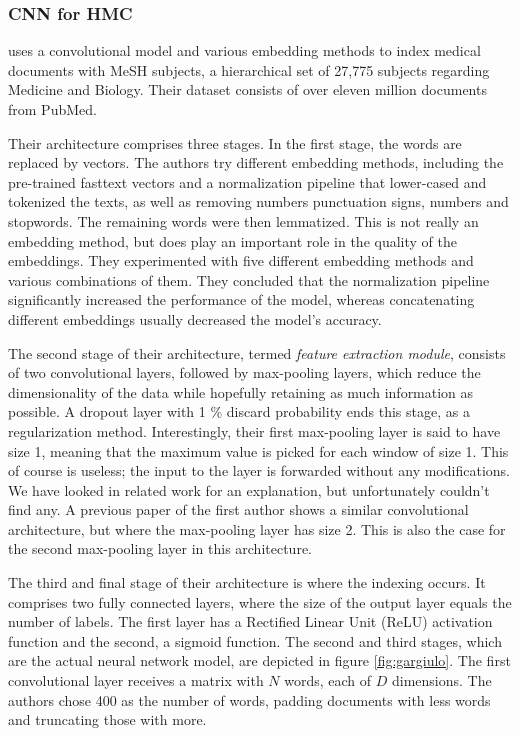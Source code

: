 \subsubsection{CNN for HMC} \label{hmc_gargiulo}

\cite{gargiulo2019deep} uses a convolutional model and various embedding methods to index medical documents with MeSH subjects, a hierarchical set of 27,775 subjects regarding Medicine and Biology. Their dataset consists of over eleven million documents from PubMed.

Their architecture comprises three stages. In the first stage, the words are replaced by vectors. The authors try different embedding methods, including the pre-trained fasttext vectors and a normalization pipeline that lower-cased and tokenized the texts, as well as removing numbers punctuation signs, numbers and stopwords. The remaining words were then lemmatized. This is not really an embedding method, but does play an important role in the quality of the embeddings. They experimented with five different embedding methods and various combinations of them. They concluded that the normalization pipeline significantly increased the performance of the model, whereas concatenating different embeddings usually decreased the model's accuracy.

The second stage of their architecture, termed \textit{feature extraction module}, consists of two convolutional layers, followed by max-pooling layers, which reduce the dimensionality of the data while hopefully retaining as much information as possible. A dropout layer with 1 \% discard probability ends this stage, as a regularization method. Interestingly, their first max-pooling layer is said to have size 1, meaning that the maximum value is picked for each window of size 1. This of course is useless; the input to the layer is forwarded without any modifications. We have looked in related work for an explanation, but unfortunately couldn't find any. A previous paper of the first author shows a similar convolutional architecture, but where the max-pooling layer has size 2. This is also the case for the second max-pooling layer in this architecture.

The third and final stage of their architecture is where the indexing occurs. It comprises two fully connected layers, where the size of the output layer equals the number of labels. The first layer has a Rectified Linear Unit (ReLU) activation function and the second, a sigmoid function. The second and third stages, which are the actual neural network model, are depicted in figure \ref{fig:gargiulo}. The first convolutional layer receives a matrix with $N$ words, each of $D$ dimensions. The authors chose 400 as the number of words, padding documents with less words and truncating those with more.

